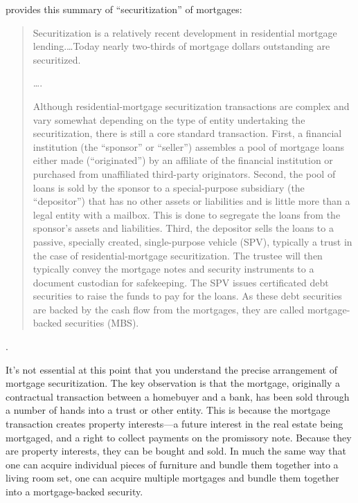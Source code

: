 
 provides this summary of
``securitization'' of mortgages:
\begin{quotation}
Securitization is a relatively recent development in residential mortgage
lending.\ldots Today nearly two-thirds of mortgage dollars
outstanding are securitized.

\ldots.

Although residential-mortgage securitization transactions are complex and vary
somewhat depending on the type of entity undertaking the securitization, there
is still a  core standard  transaction. First, a financial  institution  (the
``sponsor''  or ``seller'') assembles a pool of mortgage loans either made
(``originated'')  by  an affiliate of the financial institution or
purchased from unaffiliated third-party originators. Second, the pool of
loans is sold by the sponsor to a special-purpose subsidiary (the
``depositor'') that has no other assets or liabilities and is little more than
a legal entity with a mailbox. This is done to segregate the loans from the
sponsor's assets and liabilities. Third, the depositor sells the loans to a
passive, specially created, single-purpose vehicle (SPV), typically a trust in
the case of residential-mortgage securitization. The trustee will then
typically convey the mortgage notes and security instruments to a document
custodian for safekeeping. The SPV issues certificated debt securities to raise
the funds to pay for the loans. As these debt securities are backed by the cash
flow from the mortgages, they are called mortgage-backed securities (MBS).
\end{quotation}
.

It's not essential at this point that you understand the precise arrangement of
mortgage securitization. The key observation is that the mortgage, originally a
contractual transaction between a homebuyer and a bank, has been sold through a
number of hands into a trust or other entity. This is because the mortgage
transaction creates property interests---a future interest in the real estate
being mortgaged, and a right to collect payments on the promissory note. Because
they are property interests, they can be bought and sold. In much the same way
that one can acquire individual pieces of furniture and bundle them together
into a living room set, one can acquire multiple mortgages and bundle them
together into a mortgage-backed security.

